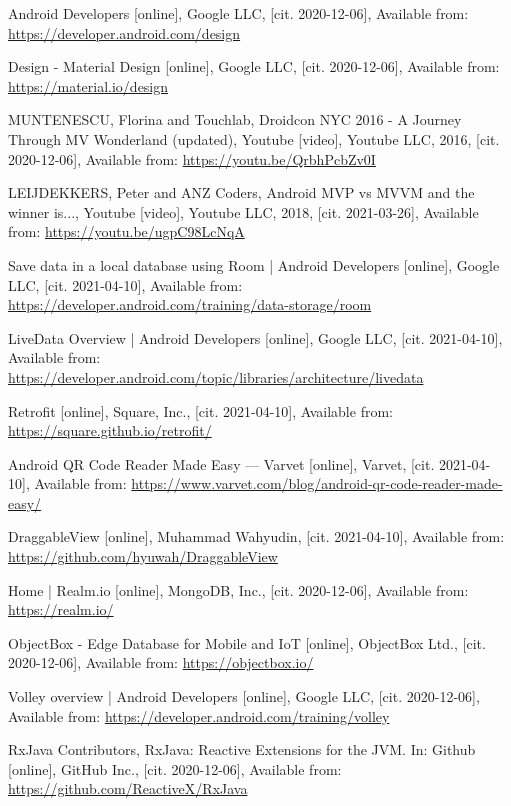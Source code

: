 \begin{thebibliography}{99}
 Android Developers [online], Google LLC, [cit. 2020-12-06], Available from: \url{https://developer.android.com/design}

 Design - Material Design [online], Google LLC, [cit. 2020-12-06], Available from: \url{https://material.io/design}

 MUNTENESCU, Florina and Touchlab, Droidcon NYC 2016 - A Journey Through MV Wonderland (updated), Youtube [video], Youtube LLC, 2016, [cit. 2020-12-06], Available from: \url{https://youtu.be/QrbhPcbZv0I}

 LEIJDEKKERS, Peter and ANZ Coders, Android MVP vs MVVM and the winner is..., Youtube [video], Youtube LLC, 2018, [cit. 2021-03-26], Available from: \url{https://youtu.be/ugpC98LcNqA}

 Save data in a local database using Room | Android Developers [online], Google LLC, [cit. 2021-04-10], Available from: \url{https://developer.android.com/training/data-storage/room}

 LiveData Overview | Android Developers [online], Google LLC, [cit. 2021-04-10], Available from: \url{https://developer.android.com/topic/libraries/architecture/livedata}

 Retrofit [online], Square, Inc., [cit. 2021-04-10], Available from: \url{https://square.github.io/retrofit/}

 Android QR Code Reader Made Easy — Varvet [online], Varvet, [cit. 2021-04-10], Available from: \url{https://www.varvet.com/blog/android-qr-code-reader-made-easy/}

 DraggableView [online], Muhammad Wahyudin, [cit. 2021-04-10], Available from: \url{https://github.com/hyuwah/DraggableView}

 Home | Realm.io [online], MongoDB, Inc., [cit. 2020-12-06], Available from: \url{https://realm.io/}

 ObjectBox - Edge Database for Mobile and IoT [online], ObjectBox Ltd., [cit. 2020-12-06], Available from: \url{https://objectbox.io/}

 Volley overview | Android Developers [online], Google LLC, [cit. 2020-12-06], Available from: \url{https://developer.android.com/training/volley}

 RxJava Contributors, RxJava: Reactive Extensions for the JVM. In: Github [online], GitHub Inc., [cit. 2020-12-06], Available from: \url{https://github.com/ReactiveX/RxJava}


\end{thebibliography}
